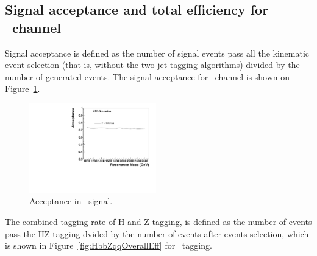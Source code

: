 \clearpage

\subsection{Signal acceptance and total efficiency for \HbbZqq\ channel}

Signal acceptance is defined as the number of signal events pass all
the kinematic event selection (that is, without the two jet-tagging
algorithms) divided by the number of generated events.  The signal
acceptance for \HbbZqq\ channel is shown on Figure~\ref{fig:Acc}.

\begin{figure}[htb]
\begin{center}
\includegraphics[width=0.49\textwidth]{EXO-14-009/HbbZqqfigs/Signal/HbbZqq-signal-acc-8TeV.pdf}
\end{center}
\caption{
Acceptance in \HbbZqq\ signal.
}
\label{fig:Acc}
\end{figure}

The combined tagging rate of H and Z tagging, is defined as the number of 
events pass the HZ-tagging dvided by the number of events after events
selection, which is shown in Figure~\ref{fig:HbbZqqOverallEff} for \HbbZqq\ 
tagging. 


